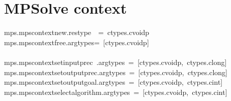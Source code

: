 \documentclass{article}\usepackage[]{graphicx}\usepackage[dvipsnames,table]{xcolor}
\makeatletter
\newcommand{\hlopt}[1]{\textcolor[rgb]{0,0,0}{#1}}%
\newcommand{\hldef}[1]{\textcolor[rgb]{0.345,0.345,0.345}{#1}}%
\newenvironment{kframe}{%
 \def\at@end@of@kframe{}%
 \ifinner\ifhmode%
  \def\at@end@of@kframe{\end{minipage}}%
  \begin{minipage}{\columnwidth}%
 \fi\fi%
 \def\FrameCommand##1{\hskip\@totalleftmargin \hskip-\fboxsep
 \colorbox{shadecolor}{##1}\hskip-\fboxsep
     \hskip-\linewidth \hskip-\@totalleftmargin \hskip\columnwidth}%
 \MakeFramed {\advance\hsize-\width
   \@totalleftmargin\z@ \linewidth\hsize
   \@setminipage}}%
 {\par\unskip\endMakeFramed%
 \at@end@of@kframe}
\newenvironment{knitrout}{}{} %
\makeatother
\begin{document}
\section{MPSolve context}
\begin{center}
\begin{minipage}[m]{15cm}
\begin{knitrout}\small
{}\color{fgcolor}\begin{kframe}
\noindent
\ttfamily
\hldef{\textunderscore mps}\hlopt{.}\hldef{mps\textunderscore context\textunderscore new}\hlopt{.}\hldef{restype}\hldef{\ \ }\hldef{}\hlopt{=\ }\hldef{ctypes}\hlopt{.}\hldef{c\textunderscore void\textunderscore p}\hldef{\ \ \ }\hldef{}\hspace*{\fill}\\
\hldef{\textunderscore mps}\hlopt{.}\hldef{mps\textunderscore context\textunderscore free}\hlopt{.}\hldef{argtypes}\hlopt{=\ {[}}\hldef{ctypes}\hlopt{.}\hldef{c\textunderscore void\textunderscore p}\hlopt{{]}\ }\hldef{}\hspace*{\fill}\\
\hldef{}\hspace*{\fill}\\
\hldef{\textunderscore mps}\hlopt{.}\hldef{mps\textunderscore context\textunderscore set\textunderscore input\textunderscore prec\ }\hlopt{.}\hldef{argtypes\ }\hlopt{=\ {[}}\hldef{ctypes}\hlopt{.}\hldef{c\textunderscore void\textunderscore p}\hlopt{,\ }\hldef{ctypes}\hlopt{.}\hldef{c\textunderscore long}\hlopt{{]}}\hspace*{\fill}\\
\hldef{\textunderscore mps}\hlopt{.}\hldef{mps\textunderscore context\textunderscore set\textunderscore output\textunderscore prec}\hlopt{.}\hldef{argtypes\ }\hlopt{=\ {[}}\hldef{ctypes}\hlopt{.}\hldef{c\textunderscore void\textunderscore p}\hlopt{,\ }\hldef{ctypes}\hlopt{.}\hldef{c\textunderscore long}\hlopt{{]}}\hspace*{\fill}\\
\hldef{\textunderscore mps}\hlopt{.}\hldef{mps\textunderscore context\textunderscore set\textunderscore output\textunderscore goal}\hlopt{.}\hldef{argtypes\ }\hlopt{=\ {[}}\hldef{ctypes}\hlopt{.}\hldef{c\textunderscore void\textunderscore p}\hlopt{,\ }\hldef{ctypes}\hlopt{.}\hldef{c\textunderscore int}\hlopt{{]}}\hspace*{\fill}\\
\hldef{\textunderscore mps}\hlopt{.}\hldef{mps\textunderscore context\textunderscore select\textunderscore algorithm}\hlopt{.}\hldef{argtypes\ }\hlopt{=\ {[}}\hldef{ctypes}\hlopt{.}\hldef{c\textunderscore void\textunderscore p}\hlopt{,\ }\hldef{ctypes}\hlopt{.}\hldef{c\textunderscore int}\hlopt{{]}}\hspace*{\fill}\\

\end{kframe}
\end{knitrout}
\end{minipage}
\end{center}
\end{document}
